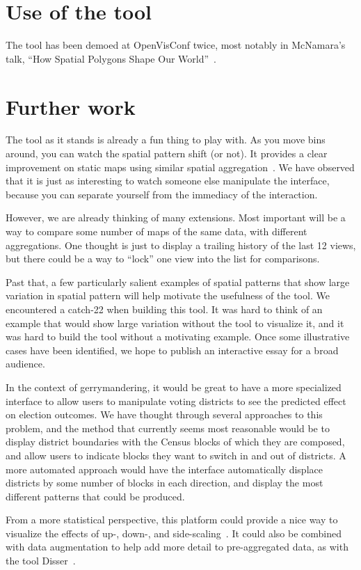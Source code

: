 \documentclass{article}\usepackage[]{graphicx}\usepackage[]{color}
\begin{document}
\section{Use of the tool}
The tool has been demoed at OpenVisConf twice, most notably in McNamara's talk, ``How Spatial Polygons Shape Our World''~\citep{McN2016f, McN2017}. 


\section{Further work}

The tool as it stands is already a fun thing to play with. As you move bins around, you can watch the spatial pattern shift (or not). It provides a clear improvement on static maps using similar spatial aggregation~\citep{SulTelWoo2008, Fel2015}. We have observed that it is just as interesting to watch someone else manipulate the interface, because you can separate yourself from the immediacy of the interaction. 

However, we are already thinking of many extensions. Most important will be a way to compare some number of maps of the same data, with different aggregations. One thought is just to display a trailing history of the last 12 views, but there could be a way to ``lock'' one view into the list for comparisons. 

Past that, a few particularly salient examples of spatial patterns that show large variation in spatial pattern will help motivate the usefulness of the tool. We encountered a catch-22 when building this tool. It was hard to think of an example that would show large variation without the tool to visualize it, and it was hard to build the tool without a motivating example. Once some illustrative cases have been identified, we hope to publish an interactive essay for a broad audience. 

In the context of gerrymandering, it would be great to have a more specialized interface to allow users to manipulate voting districts to see the predicted effect on election outcomes. We have thought through several approaches to this problem, and the method that currently seems most reasonable would be to display district boundaries with the Census blocks of which they are composed, and allow users to indicate blocks they want to switch in and out of districts. A more automated approach would have the interface automatically displace districts by some number of blocks in each direction, and display the most different patterns that could be produced. 

From a more statistical perspective, this platform could provide a nice way to visualize the effects of up-, down-, and side-scaling~\citep{Atk2013, Kyr2004}. It could also be combined with data augmentation to help add more detail to pre-aggregated data, as with the tool Disser~\citep{Mar2014}. 

\clearpage




 


\end{document}
